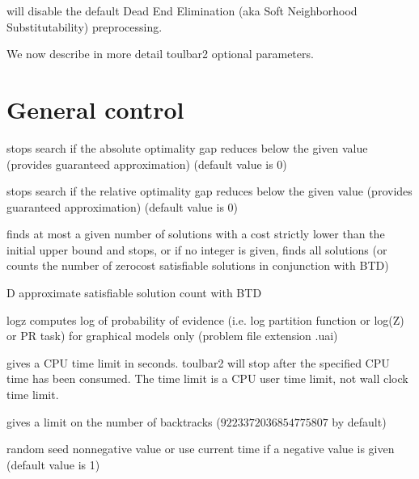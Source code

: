 \documentclass[letterpaper,10pt,openany,oneside,english]{sphinxmanual}
\begin{document}
\sphinxAtStartPar
will disable the default Dead End Elimination  (aka Soft
Neighborhood Substitutability) preprocessing.

\sphinxAtStartPar
We now describe in more detail toulbar2 optional parameters.


\section{General control}
\label{\detokenize{userdoc:general-control}}\begin{description}
\sphinxAtStartPar
stops search if the absolute optimality gap reduces below the given value (provides guaranteed approximation) (default value is 0)

\sphinxAtStartPar
stops search if the relative optimality gap reduces below the given value (provides guaranteed approximation) (default value is 0)

\sphinxAtStartPar
finds at most a given number of solutions with a cost strictly lower than the initial upper bound and stops, or if no integer is given, finds all solutions (or counts the number of zero\sphinxhyphen{}cost satisfiable solutions in conjunction with BTD)

\end{description}
\begin{optionlist}{3cm}
\item [\sphinxhyphen{}D]  
\sphinxAtStartPar
approximate satisfiable solution count with BTD
\item [\sphinxhyphen{}logz]  
\sphinxAtStartPar
computes log of probability of evidence (i.e. log partition function or log(Z) or PR task) for graphical models only (problem file extension .uai)
\end{optionlist}
\begin{description}
\sphinxAtStartPar
gives a CPU time limit in seconds. toulbar2 will stop after the specified CPU time has been consumed. The time limit is a CPU user time limit, not wall clock time limit.

\sphinxAtStartPar
gives a limit on the number of backtracks (\(9223372036854775807\) by default)

\sphinxAtStartPar
random seed non\sphinxhyphen{}negative value or use current time if a negative value is given (default value is 1)

\end{description}
\end{document}
